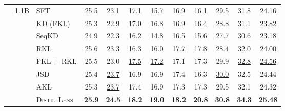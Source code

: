 \begin{table}[!t]
\begin{tabular}{lrl|cc|cc|cc|c|c||c}
     & \multirow{8}{*}{1.1B}
        & SFT & 25.5 & 23.1 & 17.1 & 15.7 & 16.9 & 16.1 & 29.5 & 31.8 & 24.16  \\
     &  & KD (FKL) &  25.3 & 22.9 & 17.0 & 16.8 & 16.9 & 16.4 & 28.8 & 31.1  & 23.82  \\
     &  & SeqKD &  24.9 & 22.3 & 16.2 & 14.8 & 16.5 & 15.6 & 27.7 & 30.6 & 23.18   \\
     & & RKL & \underline{25.6} & 23.3 & 16.3 & 16.0 & \underline{17.7} & \underline{17.8} & 28.4 & 32.0 & 24.00 \\
     & & FKL + RKL & 25.5 & 23.0 & \underline{17.5} & \underline{17.2} & 17.1 & 17.3 & 29.9 & \underline{32.8} & \underline{24.56} \\
     & & JSD & 25.4 & \underline{23.7} & 16.9 & 16.9 & 17.4 & 16.3 & \underline{30.0} & 32.5 & 24.44   \\
     & & AKL & 25.3 & \underline{23.7} & 17.4 & 16.9 & 17.3 & 17.3 & 29.5 & 32.1 & 24.32 \\
     & & \textsc{DistillLens} & \textbf{25.9} & \textbf{24.5} & \textbf{18.2} & \textbf{19.0} & \textbf{18.2} & \textbf{20.8} & \textbf{30.8} & \textbf{34.3} & \textbf{25.48} \\
     \bottomrule
    \end{tabular}
    \label{tab:main_results}
\end{table}
